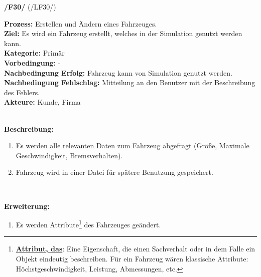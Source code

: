 \documentclass[11pt,a4paper]{article}
\begin{document}
	\noindent\large\textbf{/F30/} (/LF30/)
	\normalsize\\
	\begin{addmargin}{0.1 \textwidth}
		\textbf{Prozess:} Erstellen und Ändern eines Fahrzeuges.\\
		\textbf{Ziel:} Es wird ein Fahrzeug erstellt, welches in der Simulation genutzt werden kann.\\
		\textbf{Kategorie:} Primär\\
		\textbf{Vorbedingung:} -\\
		\textbf{Nachbedingung Erfolg:}  Fahrzeug kann von Simulation genutzt werden.\\
		\textbf{Nachbedingung Fehlschlag:} Mitteilung an den Benutzer mit der Beschreibung des Fehlers.\\
		\textbf{Akteure:} Kunde, Firma\\
		\\
		\begin{minipage}{\textwidth}
			\textbf{Beschreibung:}
			\begin{enumerate}
				\item Es werden alle relevanten Daten zum Fahrzeug abgefragt (Größe, Maximale Geschwindigkeit, Bremsverhalten).
				\item Fahrzeug wird in einer Datei für spätere Benutzung gespeichert.\\
			\end{enumerate}
		\end{minipage}
		\\
		\begin{minipage}{\textwidth}
			\textbf{Erweiterung:}
			\begin{enumerate}
				\item Es werden Attribute\footnote{\underline{\textbf{Attribut, das}}: Eine Eigenschaft, die einen Sachverhalt oder in dem Falle ein Objekt eindeutig beschreiben. Für ein Fahrzeug wären klassische Attribute: Höchstgeschwindigkeit, Leistung, Abmessungen, etc.} des Fahrzeuges geändert.\\
			\end{enumerate}
		\end{minipage}
	\end{addmargin}
	
\end{document}
